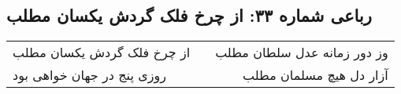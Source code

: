 \begin{center}
\section*{رباعی شماره ۳۳: از چرخ فلک گردش یکسان مطلب}
\label{sec:sh033}
\begin{longtable}{l p{0.5cm} r}
از چرخ فلک گردش یکسان مطلب
&&
وز دور زمانه عدل سلطان مطلب
\\
روزی پنج در جهان خواهی بود
&&
آزار دل هیچ مسلمان مطلب
\\
\end{longtable}
\end{center}
